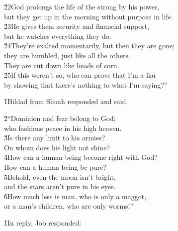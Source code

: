\begin{poetry}
\poeml \v{22}God prolongs the life of the strong by his power, \\
\poemll    but they get up in the morning without purpose in life. \\
\poeml \v{23}He gives them security and financial support, \\
\poemll    but he watches everything they do. \\
\poeml \v{24}They're exalted momentarily, but then they are gone; \\
\poemll    they are humbled, just like all the others. \\
\poemlll       They are cut down like heads of corn. \\
\poeml \v{25}If this weren't so, who can prove that I'm a liar \\
\poemll    by showing that there's nothing to what I'm saying?''
\end{poetry}

\v{1}Bildad from Shuah responded and said:

\begin{poetry}
\poeml \v{2}``Dominion and fear belong to God; \\
\poemll    who fashions peace in his high heaven. \\
\poeml \v{3}Is there any limit to his armies? \\
\poemll    On whom does his light not shine? \\
\poeml \v{4}How can a human being become right with God? \\
\poemll    How can a human being be pure? \\
\poeml \v{5}Behold, even the moon isn't bright, \\
\poemll    and the stars aren't pure in his eyes. \\
\poeml \v{6}How much less is man, who is only a maggot, \\
\poemll    or a man's children, who are only worms!''
\end{poetry}

\v{1}In reply, Job responded:

